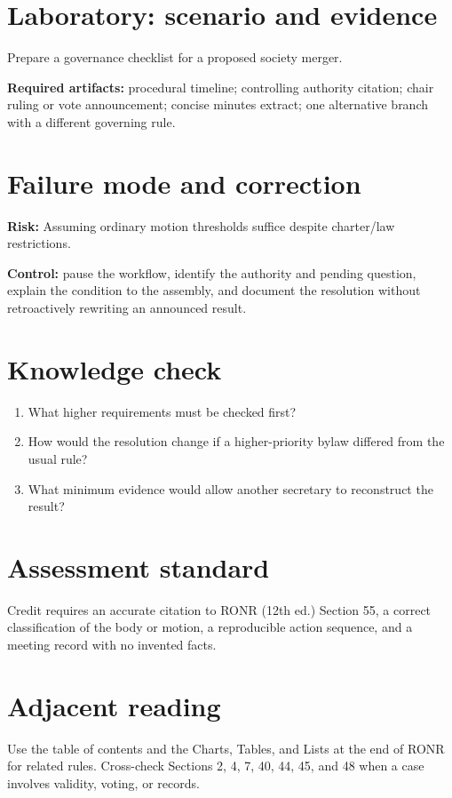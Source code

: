\documentclass[11pt]{article}
\begin{document}
\section{Laboratory: scenario and evidence}
Prepare a governance checklist for a proposed society merger.

\textbf{Required artifacts:} procedural timeline; controlling authority citation; chair ruling or vote announcement; concise minutes extract; one alternative branch with a different governing rule.

\section{Failure mode and correction}
\textbf{Risk:} Assuming ordinary motion thresholds suffice despite charter/law restrictions.

\textbf{Control:} pause the workflow, identify the authority and pending question, explain the condition to the assembly, and document the resolution without retroactively rewriting an announced result.

\section{Knowledge check}
\begin{enumerate}[leftmargin=*,itemsep=4pt]
\item What higher requirements must be checked first?
\item How would the resolution change if a higher-priority bylaw differed from the usual rule?
\item What minimum evidence would allow another secretary to reconstruct the result?
\end{enumerate}

\section{Assessment standard}
Credit requires an accurate citation to RONR (12th ed.) Section 55, a correct classification of the body or motion, a reproducible action sequence, and a meeting record with no invented facts.

\section{Adjacent reading}
Use the table of contents and the Charts, Tables, and Lists at the end of RONR for related rules. Cross-check Sections 2, 4, 7, 40, 44, 45, and 48 when a case involves validity, voting, or records.
\end{document}
